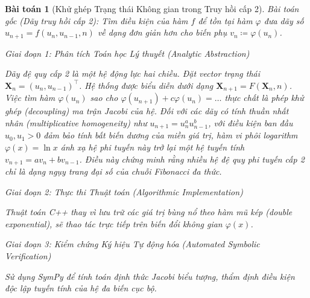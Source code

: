 \documentclass{article}
\newtheorem{baitoan}{Bài toán}
\begin{document}
\begin{baitoan}[Khử ghép Trạng thái Không gian trong Truy hồi cấp 2]
 \emph{Bài toán gốc (Dãy truy hồi cấp 2):} 
 Tìm điều kiện của hàm $f$ để tồn tại hàm $\varphi$ đưa dãy số $u_{n+1} = f(u_n,u_{n-1},n)$ về dạng đơn giản hơn cho biến phụ $v_n\coloneqq\varphi(u_n)$.

\vspace{0.5em}\noindent\emph{Giai đoạn 1: Phân tích Toán học Lý thuyết (Analytic Abstraction)}
 
 Dãy đệ quy cấp 2 là một hệ động lực hai chiều. Đặt vector trạng thái $\mathbf{X}_n = (u_n, u_{n-1})^\top$. Hệ thống được biểu diễn dưới dạng $\mathbf{X}_{n+1} = F(\mathbf{X}_n, n)$. 
 Việc tìm hàm $\varphi(u_n)$ sao cho $\varphi(u_{n+1}) + c \varphi(u_n) = \dots$ thực chất là phép khử ghép (decoupling) ma trận Jacobi của hệ. Đối với các dãy có tính thuần nhất nhân (multiplicative homogeneity) như $u_{n+1} = u_n^a u_{n-1}^b$, với điều kiện ban đầu $u_0, u_1 > 0$ đảm bảo tính bất biến dương của miền giá trị, hàm vi phôi logarithm $\varphi(x) = \ln x$ ánh xạ hệ phi tuyến này trở lại một hệ tuyến tính $v_{n+1} = a v_n + b v_{n-1}$. Điều này chứng minh rằng nhiều hệ đệ quy phi tuyến cấp 2 chỉ là dạng ngụy trang đại số của chuỗi Fibonacci đa thức.

\vspace{0.5em}\noindent\emph{Giai đoạn 2: Thực thi Thuật toán (Algorithmic Implementation)}
 
 Thuật toán C++ thay vì lưu trữ các giá trị bùng nổ theo hàm mũ kép (double exponential), sẽ thao tác trực tiếp trên biến đổi không gian $\varphi(x)$. 



\vspace{0.5em}\noindent\emph{Giai đoạn 3: Kiểm chứng Ký hiệu Tự động hóa (Automated Symbolic Verification)}
 
 Sử dụng \textsf{SymPy} để tính toán định thức Jacobi biểu tượng, thẩm định điều kiện độc lập tuyến tính của hệ đa biến cục bộ.




\end{baitoan}
\end{document}
